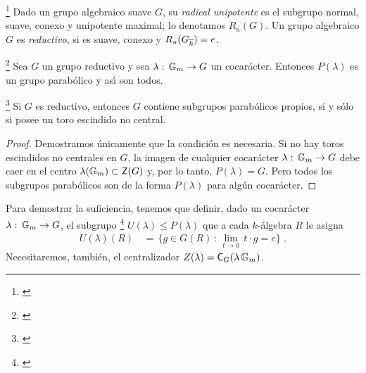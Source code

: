 \begin{defReductivo}\label{def:reductivo}
	\footnote{
		\cite[\S~6.46]{MilneAlgebraicGroups}
	}
	Dado un grupo algebraico suave $G$, su \emph{radical unipotente} es el
	subgrupo normal, suave, conexo y unipotente maximal; lo denotamos
	$R_u(G)$. Un grupo algebraico $G$ es \emph{reductivo}, si es suave,
	conexo y $R_u(G_{\algclos k})=e$.
\end{defReductivo}

\begin{teoElGrupoDeUnaCurva}\label{thm:elgrupodeunacurva}
	\footnote{
		\cite[Theorem~25.1]{MilneAlgebraicGroups}
	}
	Sea $G$ un grupo reductivo y sea
	$\lambda:\,\multiplicativo\rightarrow G$ un cocar\'{a}cter. Entonces
	$P(\lambda)$ es un grupo parab\'{o}lico y as\'{\i} son todos.
\end{teoElGrupoDeUnaCurva}

\begin{propoCocaracteresYParabolicosPropios}%
	\label{propo:cocaracteres:parabolicospropios}
	\footnote{
		\cite[Proposition~25.2]{MilneAlgebraicGroups}
	}
	Si $G$ es reductivo, entonces $G$ contiene subgrupos parab\'{o}licos
	propios, si y s\'{o}lo si posee un toro escindido no central.
\end{propoCocaracteresYParabolicosPropios}

\begin{proof}
	Demostramos \'{u}nicamente que la condici\'{o}n es necesaria. Si no hay
	toros escindidos no centrales en $G$, la imagen de cualquier
	cocar\'{a}cter $\lambda:\,\multiplicativo\rightarrow G$ debe caer en el
	centro $\lambda(\multiplicativo)\subset\centre(G)$ y, por lo tanto,
	$P(\lambda)=G$. Pero todos los subgrupos parab\'{o}licos son de la
	forma $P(\lambda)$ para alg\'{u}n cocar\'{a}cter.
\end{proof}

Para demostrar la suficiencia, tenemos que definir, dado un cocar\'{a}cter
$\lambda:\,\multiplicativo\rightarrow G$, el subgrupo%
\footnote{
	\cite[Proposition~13.29]{MilneAlgebraicGroups}
}
$U(\lambda)\leq P(\lambda)$ que a cada $k$-\'{a}lgebra $R$ le asigna
\begin{align*}
	U(\lambda)(R) & \,=\,\Big\{g\in G(R)\,:\,\lim_{t\to 0}\,t\cdot g=e
		\Big\}
	\text{ .}
\end{align*}
%
Necesitaremos, tambi\'{e}n, el centralizador
$Z(\lambda)=\centraliza[G](\lambda\,\multiplicativo)$.

